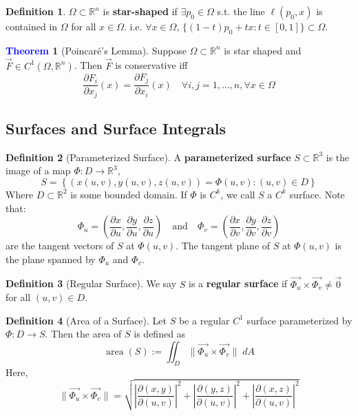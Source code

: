 \documentclass[11pt]{article}
\theoremstyle{definition}
\theoremstyle{definition}
\newcommand{\R}[0]{\mathbb{R}}
\newtheorem{theorem}{\textcolor{blue}{Theorem}}
\theoremstyle{definition}
\newtheorem{definition}{\textcolor{OliveGreen}{Definition}}
\theoremstyle{remark}
\begin{document}
\begin{definition}
    $\Omega \subset \R^n$ is \textbf{star-shaped} if $\exists p_0 \in \Omega$ s.t. the line $\ell(p_0, x)$ is
    contained in $\Omega$ for all $x \in \Omega$. i.e. $\forall x \in \Omega$, $\{(1 - t)p_0 + tx : t \in [0, 1]\} \subset \Omega$.   
\end{definition}

\begin{theorem}[Poincaré's Lemma]
    Suppose $\Omega \subset \R^n$ is star shaped and $\vec{F} \in C^1(\Omega, \R^n)$. Then $\vec{F}$ is conservative
    iff 
    \[
        \frac{\partial F_i}{\partial x_j}(x) = \frac{\partial F_j}{\partial x_i}(x) \quad \forall i, j = 1, \dots, n, \forall x \in \Omega
    \]    
\end{theorem}


\subsection{Surfaces and Surface Integrals}


\begin{definition}[Parameterized Surface]
    A \textbf{parameterized surface} $S \subset \R^3$ is the image of a map $\Phi : D \to \R^3 $,
    \[
        S = \left\{ (x(u,v), y(u,v), z(u,v)) = \Phi(u,v) : (u,v) \in D \right\} 
    \]   
    Where $D \subset \R^2$ is some bounded domain. If $\Phi$ is $C^k$, we call $S$ a $C^k$ surface. Note that:
    \[
        \Phi_u = (\frac{\partial x}{\partial u}, \frac{\partial y}{\partial u}, \frac{\partial z}{\partial u}) \quad \text{and} \quad \Phi_v = (\frac{\partial x}{\partial v}, \frac{\partial y}{\partial v}, \frac{\partial z}{\partial v})
    \]     
    are the tangent vectors of $S$ at $\Phi(u,v)$. The tangent plane of $S$ at $\Phi(u,v)$ is the plane spanned by $\Phi_u$ and $\Phi_v$.
\end{definition}

\begin{definition}[Regular Surface]
    We say $S$ is a \textbf{regular surface} if $\vec{\Phi_u} \times \vec{\Phi_v} \neq \vec{0}$ for all $(u,v) \in D$. 

\end{definition}

\begin{definition}[Area of a Surface]
    Let $S$ be a regular $C^1$ surface parameterized by $\Phi : D \to S$. Then the area of $S$ is defined as
    \[
        \operatorname{area}(S) := \iint_{D} \| \vec{\Phi_u} \times \vec{\Phi_v} \| \; dA
    \] 
    Here,
    \[
        \| \vec{\Phi_u} \times \vec{\Phi_v} \| = \sqrt{\left| \frac{\partial(x,y)}{\partial(u,v)} \right|^2 + \left| \frac{\partial(y,z)}{\partial(u,v)} \right|^2 + \left| \frac{\partial(x,z)}{\partial(u,v)} \right|^2}
    \] 
    
\end{definition}
\end{document}
